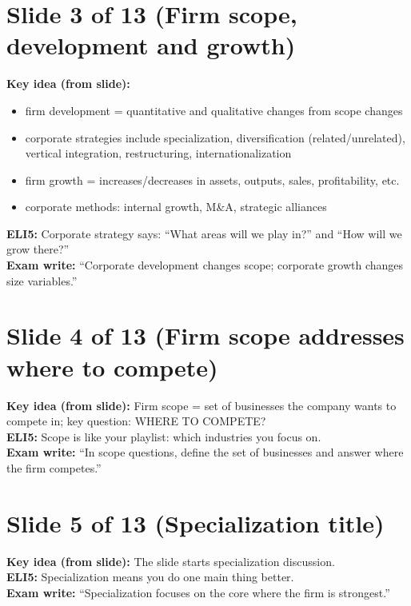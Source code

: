 \documentclass[11pt,a4paper]{article}
\begin{document}
\section*{Slide 3 of 13 (Firm scope, development and growth)}
\textbf{Key idea (from slide):}
\begin{itemize}
  \item firm development = quantitative and qualitative changes from scope changes
  \item corporate strategies include specialization, diversification (related/unrelated), vertical integration, restructuring, internationalization
  \item firm growth = increases/decreases in assets, outputs, sales, profitability, etc.
  \item corporate methods: internal growth, M\&A, strategic alliances
\end{itemize}
\textbf{ELI5:} Corporate strategy says: ``What areas will we play in?'' and ``How will we grow there?''\\
\textbf{Exam write:} ``Corporate development changes scope; corporate growth changes size variables.''

\section*{Slide 4 of 13 (Firm scope addresses where to compete)}
\textbf{Key idea (from slide):} Firm scope = set of businesses the company wants to compete in; key question: WHERE TO COMPETE?\\
\textbf{ELI5:} Scope is like your playlist: which industries you focus on.\\
\textbf{Exam write:} ``In scope questions, define the set of businesses and answer where the firm competes.''

\section*{Slide 5 of 13 (Specialization title)}
\textbf{Key idea (from slide):} The slide starts specialization discussion.\\
\textbf{ELI5:} Specialization means you do one main thing better.\\
\textbf{Exam write:} ``Specialization focuses on the core where the firm is strongest.''

\end{document}
